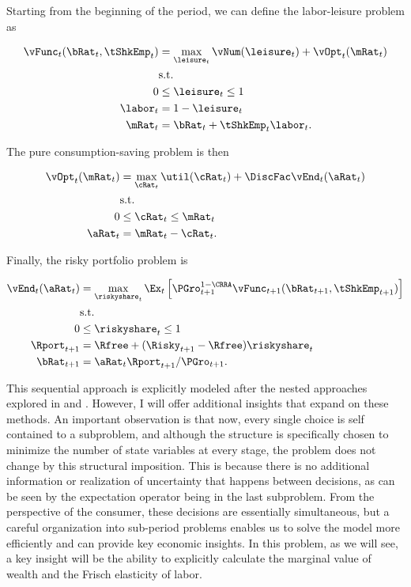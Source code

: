 \documentclass[\econtexRoot/SequentialEGM]{subfiles}
\begin{document}
Starting from the beginning of the period, we can define the labor-leisure problem as

\begin{equation}
	\begin{split}
		\vFunc_{t}(\bRat_{t}, \tShkEmp_{t}) & = \max_{ \leisure_{t}}
		\vNum(\leisure_{t}) + \vOpt_{t} (\mRat_{t}) \\
		& \text{s.t.} \\
		0 & \leq \leisure_{t} \leq 1 \\
		\labor_{t} & = 1 - \leisure_{t} \\
		\mRat_{t} & = \bRat_{t} + \tShkEmp_{t}\labor_{t}.
	\end{split}
\end{equation}

The pure consumption-saving problem is then

\begin{equation}
	\begin{split}
		\vOpt_{t}(\mRat_{t}) & = \max_{\cRat_{t}} \util(\cRat_{t}) + \DiscFac\vEnd_{t}(\aRat_{t}) \\
		& \text{s.t.} \\
		0 & \leq \cRat_{t} \leq \mRat_{t} \\
		\aRat_{t} & = \mRat_{t} - \cRat_{t}.
	\end{split}
\end{equation}

Finally, the risky portfolio problem is

\begin{equation}
	\begin{split}
		\vEnd_{t}(\aRat_{t}) & = \max_{\riskyshare_{t}}
		\Ex_{t} \left[ \PGro_{t+1}^{1-\CRRA}
			\vFunc_{t+1}(\bRat_{t+1},
			\tShkEmp_{t+1}) \right] \\
		& \text{s.t.} \\
		0 & \leq \riskyshare_{t} \leq 1 \\
		\Rport_{t+1} & = \Rfree + (\Risky_{t+1} - \Rfree)
		\riskyshare_{t} \\
		\bRat_{t+1} & = \aRat_{t} \Rport_{t+1} / \PGro_{t+1}.
	\end{split}
\end{equation}

This sequential approach is explicitly modeled after the nested approaches explored in  \cite{Clausen2020-zo} and \cite{Druedahl2021-wl}. However, I will offer additional insights that expand on these methods. An important observation is that now, every single choice is self contained to a subproblem, and although the structure is specifically chosen to minimize the number of state variables at every stage, the problem does not change by this structural imposition. This is because there is no additional information or realization of uncertainty that happens between decisions, as can be seen by the expectation operator being in the last subproblem. From the perspective of the consumer, these decisions are essentially simultaneous, but a careful organization into sub-period problems enables us to solve the model more efficiently and can provide key economic insights. In this problem, as we will see, a key insight will be the ability to explicitly calculate the marginal value of wealth and the Frisch elasticity of labor.
\end{document}
